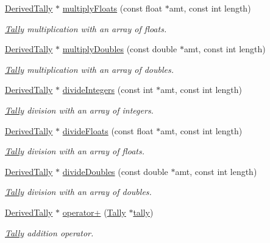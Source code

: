 \begin{DoxyCompactItemize}
\hyperlink{classDerivedTally}{Derived\-Tally} $\ast$ \hyperlink{classTally_a6c65125170bb849a80e1e88fa3c31152}{multiply\-Floats} (const float $\ast$amt, const int length)
\begin{DoxyCompactList}\small\item\em \hyperlink{classTally}{Tally} multiplication with an array of floats. \end{DoxyCompactList}\item 
\hyperlink{classDerivedTally}{Derived\-Tally} $\ast$ \hyperlink{classTally_a1128fb118526992d780449b2cb321b2b}{multiply\-Doubles} (const double $\ast$amt, const int length)
\begin{DoxyCompactList}\small\item\em \hyperlink{classTally}{Tally} multiplication with an array of doubles. \end{DoxyCompactList}\item 
\hyperlink{classDerivedTally}{Derived\-Tally} $\ast$ \hyperlink{classTally_aa5ec92d46f8b27461dd8d92de3fda86e}{divide\-Integers} (const int $\ast$amt, const int length)
\begin{DoxyCompactList}\small\item\em \hyperlink{classTally}{Tally} division with an array of integers. \end{DoxyCompactList}\item 
\hyperlink{classDerivedTally}{Derived\-Tally} $\ast$ \hyperlink{classTally_a76b9fa35eabb07d0e31d994b627983a8}{divide\-Floats} (const float $\ast$amt, const int length)
\begin{DoxyCompactList}\small\item\em \hyperlink{classTally}{Tally} division with an array of floats. \end{DoxyCompactList}\item 
\hyperlink{classDerivedTally}{Derived\-Tally} $\ast$ \hyperlink{classTally_aff77b58ca33931af447b80668e6ea5b7}{divide\-Doubles} (const double $\ast$amt, const int length)
\begin{DoxyCompactList}\small\item\em \hyperlink{classTally}{Tally} division with an array of doubles. \end{DoxyCompactList}\item 
\hyperlink{classDerivedTally}{Derived\-Tally} $\ast$ \hyperlink{classTally_aecaeb26eeb3781184e3bc2d40980d8ea}{operator+} (\hyperlink{classTally}{Tally} $\ast$\hyperlink{classTally_a50c7919393799145f1ab23457d47b02b}{tally})
\begin{DoxyCompactList}\small\item\em \hyperlink{classTally}{Tally} addition operator. \end{DoxyCompactList}\item 

\end{DoxyCompactItemize}
